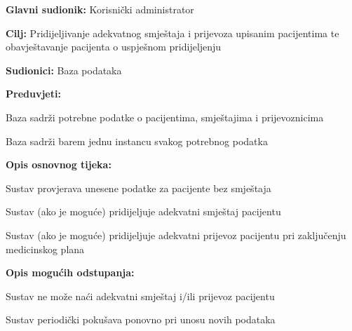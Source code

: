 					\noindent {}
					\begin{packed_item}
						\item \textbf{Glavni sudionik:} Korisnički administrator
						\item  \textbf{Cilj:} Pridijeljivanje adekvatnog smještaja i prijevoza upisanim pacijentima te obavještavanje pacijenta o uspješnom pridijeljenju
						\item  \textbf{Sudionici:} Baza podataka
						\item  \textbf{Preduvjeti:}
						\item[] \begin{packed_enum}
							\item Baza sadrži potrebne podatke o pacijentima, smještajima i prijevoznicima
							\item Baza sadrži barem jednu instancu svakog potrebnog podatka
						\end{packed_enum}
						
						\item  \textbf{Opis osnovnog tijeka:}
						\item[] \begin{packed_enum}
							\item Sustav provjerava unesene podatke za pacijente bez smještaja
							\item Sustav (ako je moguće) pridijeljuje adekvatni smještaj pacijentu
							\item Sustav (ako je moguće) pridijeljuje adekvatni prijevoz pacijentu pri zaključenju medicinskog plana
						\end{packed_enum}
						
						\item  \textbf{Opis mogućih odstupanja:}
						\item[] \begin{packed_item}
							\item[2.a] Sustav ne može naći adekvatni smještaj i/ili prijevoz pacijentu
							\item[] \begin{packed_enum}
								\item Sustav periodički pokušava ponovno pri unosu novih podataka
							\end{packed_enum}
						\end{packed_item}
					\end{packed_item}
					
